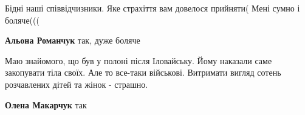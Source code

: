 
Бідні наші співвідчизники. Яке страхіття вам довелося прийняти(
Мені сумно і боляче(((

\begin{itemize} %
\textbf{Альона Романчук} так, дуже боляче
\end{itemize} %


Маю знайомого, що був у полоні після Іловайську. Йому наказали саме закопувати
тіла своїх. Але то все-таки військові. Витримати вигляд сотень розчавлених
дітей та жінок - страшно.

\begin{itemize} %
\textbf{Олена Макарчук} так
\end{itemize} %
